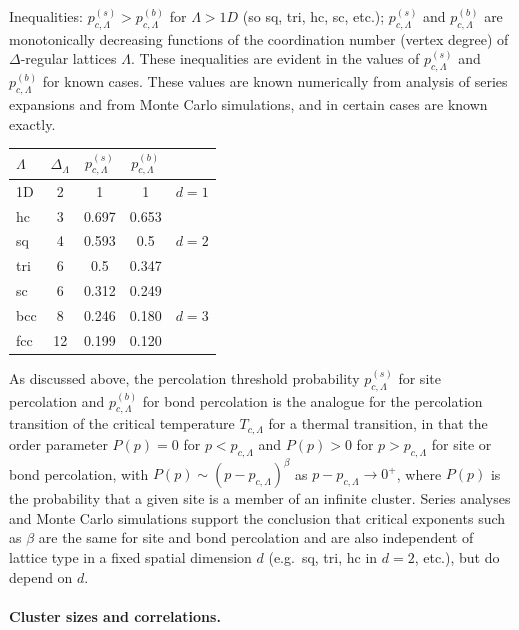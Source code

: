 Inequalities: $p_{c,\Lambda}^{(s)}>p_{c,\Lambda}^{(b)}$ for $\Lambda>1D$ (so sq, tri, hc, sc, etc.); $p_{c,\Lambda}^{(s)}$ and
$p_{c,\Lambda}^{(b)}$ are monotonically decreasing functions of the coordination number (vertex degree) of $\Delta$-regular
lattices $\Lambda$. These inequalities are evident in the values of $p_{c,\Lambda}^{(s)}$ and $p_{c,\Lambda}^{(b)}$ for known
cases. These values are known numerically from analysis of series expansions and from Monte Carlo simulations, and in certain
cases are known exactly.
\begin{center}
\begin{tabular}{lcccc}
  $\Lambda$ & $\Delta_\Lambda$ & $p_{c,\Lambda}^{(s)}$ & $p_{c,\Lambda}^{(b)}$ & \\ \hline
  1D & 2 & 1 & 1 & $d = 1$\\ \hline
  hc & 3 & 0.697 & 0.653 & \\
  sq & 4 & 0.593 & 0.5 & $d = 2$\\
  tri & 6 & 0.5 & 0.347 & \\ \hline
  sc & 6 & 0.312 & 0.249 & \\
  bcc & 8 & 0.246 & 0.180 & $d = 3$\\
  fcc & 12 & 0.199 & 0.120 &
\end{tabular}
\end{center}
As discussed above, the percolation threshold probability $p_{c,\Lambda}^{(s)}$ for site percolation and
$p_{c,\Lambda}^{(b)}$ for bond percolation is the analogue for the percolation transition of the critical temperature
$T_{c,\Lambda}$ for a thermal transition, in that the order parameter $P(p) = 0$ for $p<p_{c,\Lambda}$ and $P(p)>0$ for
$p>p_{c,\Lambda}$ for site or bond percolation, with $P(p)\sim(p-p_{c,\Lambda})^\beta$ as $p-p_{c,\Lambda}\to 0^+$, where
$P(p)$ is the probability that a given site is a member of an infinite cluster. Series analyses and Monte Carlo simulations
support the conclusion that critical exponents such as $\beta$ are the same for site and bond percolation and are also
independent of lattice type in a fixed spatial dimension $d$ (e.g.\ sq, tri, hc in $d = 2$, etc.), but do depend on $d$.

\paragraph{Cluster sizes and correlations.}

